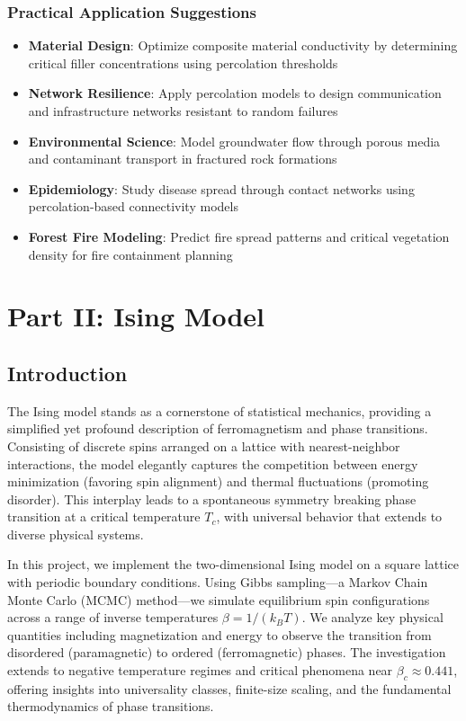 \documentclass[11pt]{article}
\providecommand{\tightlist}{%
      \setlength{\itemsep}{0pt}\setlength{\parskip}{0pt}}
\begin{document}
\subsubsection{Practical Application
Suggestions}\label{practical-application-suggestions}

\begin{itemize}
\tightlist
\item
  \textbf{Material Design}: Optimize composite material conductivity by
  determining critical filler concentrations using percolation
  thresholds
\item
  \textbf{Network Resilience}: Apply percolation models to design
  communication and infrastructure networks resistant to random failures
\item
  \textbf{Environmental Science}: Model groundwater flow through porous
  media and contaminant transport in fractured rock formations
\item
  \textbf{Epidemiology}: Study disease spread through contact networks
  using percolation-based connectivity models
\item
  \textbf{Forest Fire Modeling}: Predict fire spread patterns and
  critical vegetation density for fire containment planning
\end{itemize}

    \section{Part II: Ising Model}\label{part-ii-ising-model}

\subsection{Introduction}\label{introduction}

The Ising model stands as a cornerstone of statistical mechanics,
providing a simplified yet profound description of ferromagnetism and
phase transitions. Consisting of discrete spins arranged on a lattice
with nearest-neighbor interactions, the model elegantly captures the
competition between energy minimization (favoring spin alignment) and
thermal fluctuations (promoting disorder). This interplay leads to a
spontaneous symmetry breaking phase transition at a critical temperature
\(T_c\), with universal behavior that extends to diverse physical
systems.

In this project, we implement the two-dimensional Ising model on a
square lattice with periodic boundary conditions. Using Gibbs
sampling---a Markov Chain Monte Carlo (MCMC) method---we simulate
equilibrium spin configurations across a range of inverse temperatures
\(\beta = 1/(k_B T)\). We analyze key physical quantities including
magnetization and energy to observe the transition from disordered
(paramagnetic) to ordered (ferromagnetic) phases. The investigation
extends to negative temperature regimes and critical phenomena near
\(\beta_c \approx 0.441\), offering insights into universality classes,
finite-size scaling, and the fundamental thermodynamics of phase
transitions.
\end{document}

